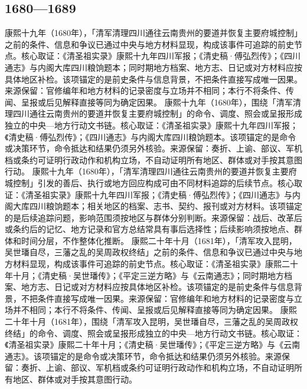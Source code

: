 \subsection{1680—1689}
康熙十九年（1680年），「清军清理四川通往云南贵州的要道并恢复主要府城控制」之前的条件、信息和争议已通过中央与地方材料显现，构成该事件可追踪的前史节点。核心取证：《清圣祖实录》康熙十九年四川军报；《清史稿·傅弘烈传》；《四川通志》与内阁大库四川粮饷题本；同时期地方档案、地方志、日记或对方材料应按具体地区补检。该项锚定的是前史条件与信息背景，不把条件直接写成唯一因果。来源保留：官修编年和地方材料的记录密度与立场并不相同；本行不将条件、传闻、呈报或后见解释直接等同为确定因果。
康熙十九年（1680年），围绕「清军清理四川通往云南贵州的要道并恢复主要府城控制」的命令、调度、照会或呈报形成独立的中央—地方行动文书链。核心取证：《清圣祖实录》康熙十九年四川军报；《清史稿·傅弘烈传》；《四川通志》与内阁大库四川粮饷题本。该项锚定的是命令或决策环节，命令抵达和结果仍须另外核验。来源保留：奏折、上谕、部议、军机档或条约可证明行政动作和机构立场，不自动证明所有地区、群体或对手按其意图行动。
康熙十九年（1680年），「清军清理四川通往云南贵州的要道并恢复主要府城控制」引发的善后、执行或地方回应构成可由不同材料追踪的后续节点。核心取证：《清圣祖实录》康熙十九年四川军报；《清史稿·傅弘烈传》；《四川通志》与内阁大库四川粮饷题本；相关地区的档案、志书、契约、报刊或对方材料。该项锚定的是后续追踪问题，影响范围须按地区与群体分别判断。来源保留：战后、改革后或条约后的记忆、地方记录和官方总结常具有事后选择性；后续影响须按地点、群体和时间分层，不作整体化推断。
康熙二十年十月（1681年），「清军攻入昆明，吴世璠自尽，三藩之乱的吴周政权终结」之前的条件、信息和争议已通过中央与地方材料显现，构成该事件可追踪的前史节点。核心取证：《清圣祖实录》康熙二十年十月；《清史稿·吴世璠传》；《平定三逆方略》与《云南通志》；同时期地方档案、地方志、日记或对方材料应按具体地区补检。该项锚定的是前史条件与信息背景，不把条件直接写成唯一因果。来源保留：官修编年和地方材料的记录密度与立场并不相同；本行不将条件、传闻、呈报或后见解释直接等同为确定因果。
康熙二十年十月（1681年），围绕「清军攻入昆明，吴世璠自尽，三藩之乱的吴周政权终结」的命令、调度、照会或呈报形成独立的中央—地方行动文书链。核心取证：《清圣祖实录》康熙二十年十月；《清史稿·吴世璠传》；《平定三逆方略》与《云南通志》。该项锚定的是命令或决策环节，命令抵达和结果仍须另外核验。来源保留：奏折、上谕、部议、军机档或条约可证明行政动作和机构立场，不自动证明所有地区、群体或对手按其意图行动。
